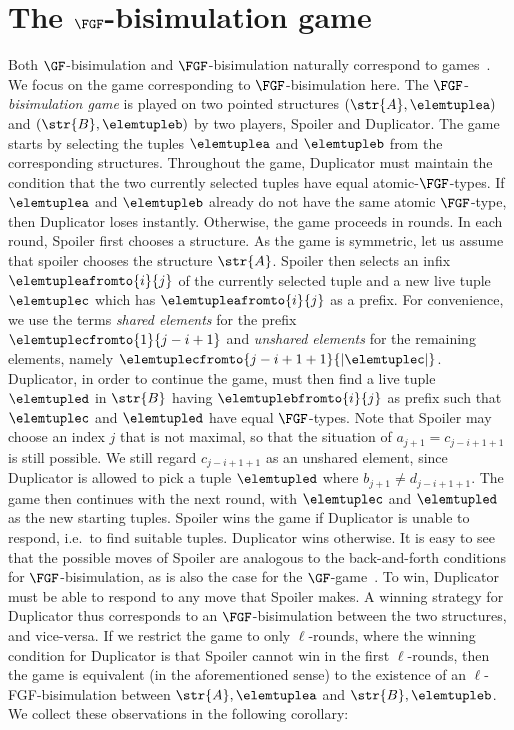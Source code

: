 \section{The $\FGF$-bisimulation game}\label{sec:fgf-game}
Both $\GF$-bisimulation and $\FGF$-bisimulation naturally correspond to games~\cite[Sec. 1.2.1]{Gradel014}.
We focus on the game corresponding to $\FGF$-bisimulation here.
The $\FGF$-\emph{bisimulation game} is played on two pointed structures $(\str{A}, \elemtuplea)$ and $(\str{B}, \elemtupleb)$ by two players, Spoiler and Duplicator.
The game starts by selecting the tuples $\elemtuplea$ and $\elemtupleb$ from the corresponding structures.
Throughout the game, Duplicator must maintain the condition that the two currently selected tuples have equal atomic-$\FGF$-types.
If $\elemtuplea$ and $\elemtupleb$ already do not have the same atomic $\FGF$-type, then Duplicator loses instantly.
Otherwise, the game proceeds in rounds.
In each round, Spoiler first chooses a structure.
As the game is symmetric, let us assume that spoiler chooses the structure $\str{A}$.
Spoiler then selects an infix $\elemtupleafromto{i}{j}$ of the currently selected tuple and a new live tuple $\elemtuplec$ which has $\elemtupleafromto{i}{j}$ as a prefix.
For convenience, we use the terms \emph{shared elements} for the prefix $\elemtuplecfromto{1}{j-i+1}$ and \emph{unshared elements} for the remaining elements, namely $\elemtuplecfromto{j-i+1+1}{|\elemtuplec|}$.
Duplicator, in order to continue the game, must then find a live tuple $\elemtupled$ in $\str{B}$ having $\elemtuplebfromto{i}{j}$ as prefix such that $\elemtuplec$ and $\elemtupled$ have equal $\FGF$-types.
Note that Spoiler may choose an index $j$ that is not maximal, so that the situation of $a_{j+1} = c_{j-i+1+1}$ is still possible.
We still regard $c_{j-i+1+1}$ as an unshared element, since Duplicator is allowed to pick a tuple $\elemtupled$ where $b_{j+1} \neq d_{j-i+1+1}$.
The game then continues with the next round, with $\elemtuplec$ and $\elemtupled$ as the new starting tuples.
Spoiler wins the game if Duplicator is unable to respond, i.e.\ to find suitable tuples.
Duplicator wins otherwise.
It is easy to see that the possible moves of Spoiler are analogous to the back-and-forth conditions for $\FGF$-bisimulation, as is also the case for the $\GF$-game~\cite[Sec.\ 1.3.2]{Gradel014}.
To win, Duplicator must be able to respond to any move that Spoiler makes.
A winning strategy for Duplicator thus corresponds to an $\FGF$-bisimulation between the two structures, and vice-versa.
If we restrict the game to only $\ell$-rounds, where the winning condition for Duplicator is that Spoiler cannot win in the first $\ell$-rounds, then the game is equivalent (in the aforementioned sense) to the existence of an $\ell$-FGF-bisimulation between $\str{A}, \elemtuplea$ and $\str{B}, \elemtupleb$.
We collect these observations in the following corollary:

